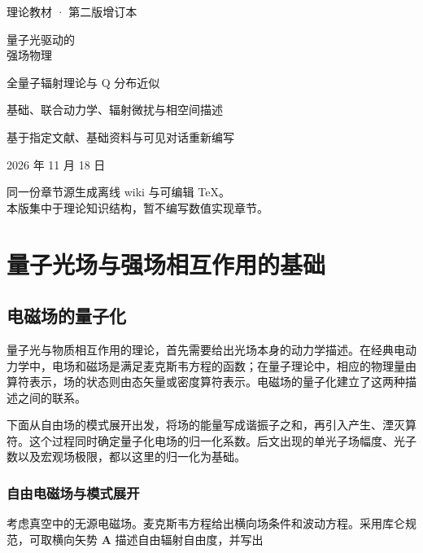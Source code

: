 \documentclass[UTF8,a4paper,zihao=-4,openany,fontset=fandol]{ctexbook}
\begin{document}
\frontmatter
\begin{titlepage}
\vspace*{22mm}
{\color{GuideTeal}\large 理论教材 · 第二版增订本}\par\vspace{10mm}
{\heiti\Huge 量子光驱动的\\[5mm]强场物理}\par\vspace{12mm}
{\Large 全量子辐射理论与 Q 分布近似}\par\vspace{7mm}
{\large 基础、联合动力学、辐射微扰与相空间描述}\par
\vfill
{\large 基于指定文献、基础资料与可见对话重新编写}\par\vspace{5mm}
{\large 2026 年 11 月 18 日}\par\vspace{8mm}
{\small 同一份章节源生成离线 wiki 与可编辑 TeX。\\
本版集中于理论知识结构，暂不编写数值实现章节。}
\end{titlepage}
\tableofcontents
\mainmatter
\setcounter{chapter}{0}

\part{量子光场与强场相互作用的基础}


\chapter{电磁场的量子化}\label{ch:01}


量子光与物质相互作用的理论，首先需要给出光场本身的动力学描述。在经典电动力学中，电场和磁场是满足麦克斯韦方程的函数；在量子理论中，相应的物理量由算符表示，场的状态则由态矢量或密度算符表示。电磁场的量子化建立了这两种描述之间的联系。



下面从自由场的模式展开出发，将场的能量写成谐振子之和，再引入产生、湮灭算符。这个过程同时确定量子化电场的归一化系数。后文出现的单光子场幅度、光子数以及宏观场极限，都以这里的归一化为基础。



\section{自由电磁场与模式展开}\label{sec:01:1}


考虑真空中的无源电磁场。麦克斯韦方程给出横向场条件和波动方程。采用库仑规范，可取横向矢势 $\mathbf A$ 描述自由辐射自由度，并写出
\end{document}
